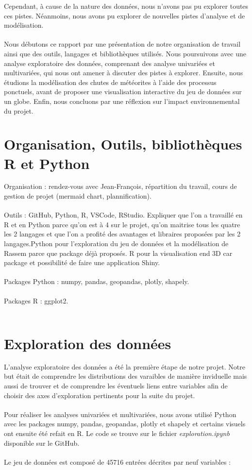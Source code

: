 \documentclass[12pt]{article}
\begin{document}
Cependant, à cause de la nature des données, nous n'avons pas pu explorer toutes ces pistes. Néanmoins, nous avons pu explorer de nouvelles pistes d'analyse et de modélisation.\\
\\
Nous débutons ce rapport par une présentation de notre organisation de travail ainsi que des outils, langages et bibliothèques utilisés. Nous poursuivons avec une analyse exploratoire des données, comprenant des analyse univariées et multivariées, qui nous ont amener à discuter des pistes à explorer. Ensuite, nous étudions la modélisation des chutes de météorites à l'aide des processus ponctuels, avant de proposer une visualisation interactive du jeu de données sur un globe. Enfin, nous concluons par une réflexion sur l'impact environnemental du projet.\\
\newpage
\section{Organisation, Outils, bibliothèques R et Python}
Organisation : rendez-vous avec Jean-François, répartition du travail, cours de gestion de projet (mermaid chart, plannification).\\
\\
Outils : GitHub, Python, R, VSCode, RStudio. Expliquer que l'on a travaillé en R et en Python parce qu'on est à 4 sur le projet, qu'on maitrise tous les quatre les 2 langages et que l'on a profité des avantages et libraires proposées par les 2 langages.Python pour l'exploration du jeu de données et la modélisation de Rassem parce que package déjà proposés. R pour la visualisation end 3D car package et possibilité de faire une application Shiny.\\
\\
Packages Python : numpy, pandas, geopandas, plotly, shapely.\\
\\
Packages R : ggplot2.\\ 
\\

\section{Exploration des données}
{\setlength{\baselineskip}{1\baselineskip}
L'analyse exploratoire des données a été la première étape de notre projet. Notre but était de comprendre les distributions des varaibles de manière inviduelle mais aussi de trouver et de comprendre les éventuels liens entre variables afin de choisir des axes d'exploration pertinents pour la suite du projet.\\
\\
Pour réaliser les analyses univariées et multivariées, nous avons utilisé Python avec les packages numpy, pandas, geopandas, plotly et shapely et certains visuels ont ensuite été refait en R. Le code se trouve sur le fichier \textit{exploration.ipynb} disponible sur le GitHub.\\
\\
Le jeu de données est composé de 45716 entrées décrites par neuf variables :\\
}
\end{document}
